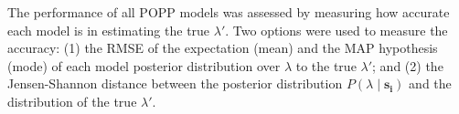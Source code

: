 
The performance of all POPP models was assessed by measuring how accurate each model is in estimating the true $\lambda'$. Two options were used to measure the accuracy: (1) the RMSE of the expectation (mean) and the MAP hypothesis (mode) of each model posterior distribution over $\lambda$ to the true $\lambda'$; and (2)  the Jensen-Shannon distance between the posterior distribution $P(\lambda \mid \mathbf{s_i})$ and the distribution of the true $\lambda'$. 

